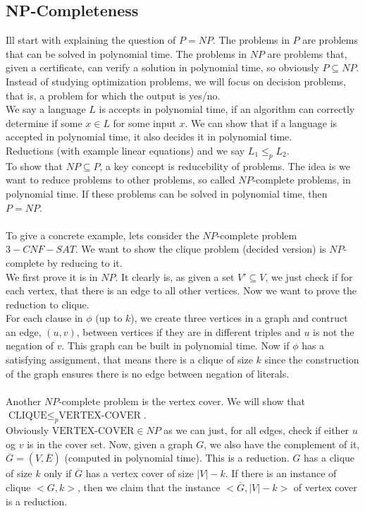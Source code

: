 \documentclass[a4paper]{article}
\author{Nikolaj Dybdahl Rathcke (rfq695)}
\begin{document}
\begin{center}
  \section*{NP-Completeness}
\end{center}
Ill start with explaining the question of $P=NP$. The problems in $P$ are problems that can be solved in polynomial time. The problems in $NP$ are problems that, given a certificate, can verify a solution in polynomial time, so obviously $P\subseteq NP$. Instead of studying optimization problems, we will focus on decision problems, that is, a problem for which the output is yes/no. \\
We say a language $L$ is accepts in polynomial time, if an algorithm can correctly determine if some $x\in L$ for some input $x$. We can show that if a language is accepted in polynomial time, it also decides it in polynomial time. \\
Reductions (with example linear equations) and we say $L_1 \leq_p L_2$. \\
To show that $NP\subseteq P$, a key concept is reducebility of problems. The idea is we want to reduce problems to other problems, so called $NP$-complete problems, in polynomial time. If these problems can be solved in polynomial time, then $P=NP$. \\
\\
To give a concrete example, lets consider the $NP$-complete problem $3-CNF-SAT$. We want to show the clique problem (decided version) is $NP$-complete by reducing to it.\\
We first prove it is in $NP$. It clearly is, as given a set $V'\subseteq V$, we just check if for each vertex, that there is an edge to all other vertices. Now we want to prove the reduction to clique. \\
For each clause in $\phi$ (up to $k$), we create three vertices in a graph and contruct an edge, $(u, v)$, between vertices if they are in different triples and $u$ is not the negation of $v$. This graph can be built in polynomial time. Now if $\phi$ has a satisfying assignment, that means there is a clique of size $k$ since the construction of the graph ensures there is no edge between negation of literals.\\
\\
Another $NP$-complete problem is the vertex cover. We will show that $\mbox{CLIQUE}\leq_p \mbox{VERTEX-COVER}$. \\
Obviously $\mbox{VERTEX-COVER}\in NP$ as we can just, for all edges, check if either $u$ og $v$ is in the cover set. Now, given a graph $G$, we also have the complement of it, $\overline{G}=(V, \overline{E})$ (computed in polynomial time). This is a reduction. $G$ has a clique of size $k$ only if $\overline{G}$ has a vertex cover of size $|V|-k$. If there is an instance of clique $<G, k>$, then we claim that the instance $<\overline{G}, |V|-k>$ of vertex cover is a reduction.
\end{document}
